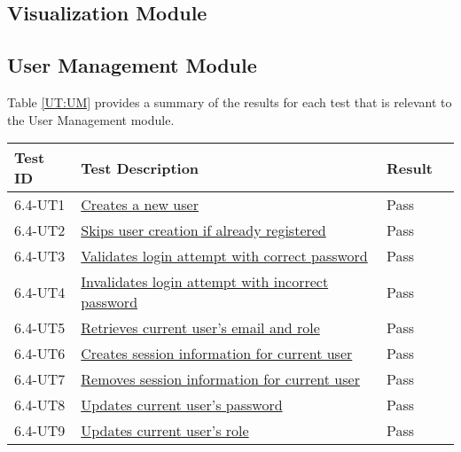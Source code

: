\documentclass[12pt, titlepage]{article}
\begin{document}
\subsection{Visualization Module}

\subsection{User Management Module}
Table \ref{UT:UM} provides a summary of the results for each test that is
relevant to the User Management module.
\begin{table}[H]
  \centering
  \begin{tabular}{|l|l|l|l|}
    \hline
    \textbf{Test ID} & \textbf{Test Description} & \textbf{Result}\\
    \hline
    6.4-UT1 & \href{https://github.com/SumanyaG/Alkalytics/blob/main/src/backend/test/userServiceTest.py}{Creates a new user} & Pass\\
    \hline
    6.4-UT2 & \href{https://github.com/SumanyaG/Alkalytics/blob/main/src/backend/test/userServiceTest.py}{Skips user creation if already registered} & Pass\\
    \hline
    6.4-UT3 & \href{https://github.com/SumanyaG/Alkalytics/blob/main/src/backend/test/userServiceTest.py}{Validates login attempt with correct password} & Pass \\
    \hline
    6.4-UT4 & \href{https://github.com/SumanyaG/Alkalytics/blob/main/src/backend/test/userServiceTest.py}{Invalidates login attempt with incorrect password} & Pass\\
    \hline
    6.4-UT5 & \href{https://github.com/SumanyaG/Alkalytics/blob/main/src/backend/test/userServiceTest.py}{Retrieves current user's email and role} & Pass \\
    \hline
    6.4-UT6 & \href{https://github.com/SumanyaG/Alkalytics/blob/main/src/backend/test/userServiceTest.py}{Creates session information for current user} & Pass\\
    \hline
    6.4-UT7 & \href{https://github.com/SumanyaG/Alkalytics/blob/main/src/backend/test/userServiceTest.py}{Removes session information for current user} & Pass\\
    \hline
    6.4-UT8 & \href{https://github.com/SumanyaG/Alkalytics/blob/main/src/backend/test/userServiceTest.py}{Updates current user's password} & Pass\\
    \hline
    6.4-UT9 & \href{https://github.com/SumanyaG/Alkalytics/blob/main/src/backend/test/userServiceTest.py}{Updates current user's role} & Pass\\

\end{tabular}
\end{table}
\end{document}
